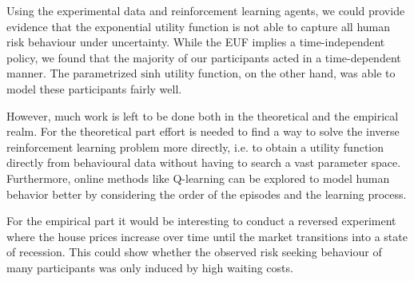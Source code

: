 Using the experimental data and reinforcement learning agents, we could provide evidence that the exponential utility function is not able to capture all human risk behaviour under uncertainty. While the EUF implies a time-independent policy, we found that the majority of our participants acted in a time-dependent manner. The parametrized $\text{sinh}$ utility function, on the other hand, was able to model these participants fairly well.

However, much work is left to be done both in the theoretical and the empirical realm. 
For the theoretical part effort is needed to find a way to solve the inverse reinforcement learning problem more directly, i.e. to obtain a utility function directly from behavioural data without having to search a vast parameter space.
Furthermore, online methods like Q-learning can be explored to model human behavior better by considering the order of the episodes and the learning process.

For the empirical part it would be interesting to conduct a reversed experiment where the house prices increase over time until the market transitions into a state of recession. This could show whether the observed risk seeking behaviour of many participants was only induced by high waiting costs. 